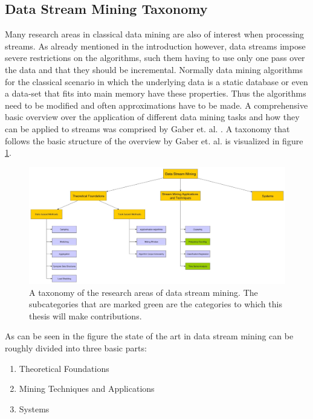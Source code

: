 \subsection{Data Stream Mining Taxonomy}
\label{subsec_dataStreamMiningTaxonomy}
Many research areas in classical data mining are also of interest when processing streams. As already mentioned in the introduction however, data streams impose severe restrictions on the algorithms, such them having to use only one pass over the data and that they should be incremental. Normally data mining algorithms for the classical scenario in which the underlying data is a static database or even a data-set that fits into main memory have these properties. Thus the algorithms need to be modified and often approximations have to be made. A comprehensive basic overview over the application of different data mining tasks and how they can be applied to streams was comprised by Gaber et. al. \cite{gaber2005mining}. A taxonomy that follows the basic structure of the overview by Gaber et. al. is visualized in figure \ref{fig_streamMiningTaxonomy}.

\begin{figure}[h]
	\centering
  	\includegraphics[width=\textwidth]{streamMiningTaxonomy}
	\caption{A taxonomy of the research areas of data stream mining. The subcategories that are marked green are the categories to which this thesis will make contributions.}
	\label{fig_streamMiningTaxonomy}
\end{figure}

As can be seen in the figure the state of the art in data stream mining can be roughly divided into three basic parts:

\begin{enumerate}
	\item Theoretical Foundations
	\item Mining Techniques and Applications
	\item Systems
\end{enumerate}

